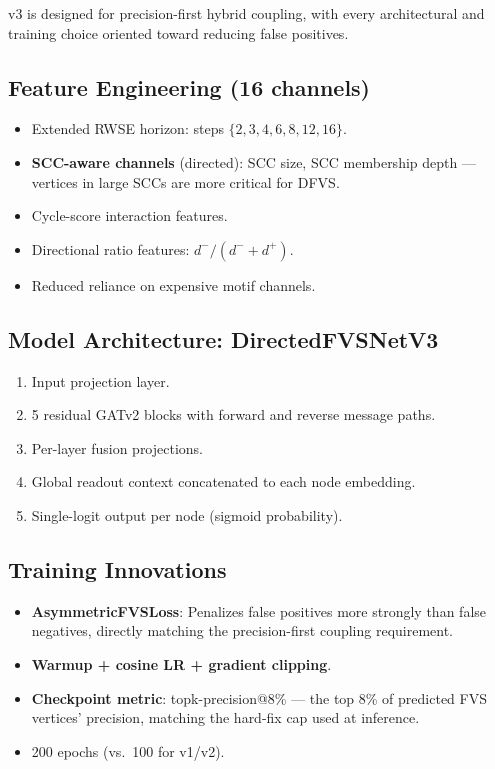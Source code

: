 \documentclass[10pt,a4paper]{report}
\theoremstyle{definition}
\begin{document}
v3 is designed for precision-first hybrid coupling, with every architectural and training choice oriented toward reducing false positives.

\subsection{Feature Engineering (16 channels)}

\begin{itemize}
	\item Extended RWSE horizon: steps $\{2, 3, 4, 6, 8, 12, 16\}$.
	\item \textbf{SCC-aware channels} (directed): SCC size, SCC membership depth — vertices in large SCCs are more critical for DFVS.
	\item Cycle-score interaction features.
	\item Directional ratio features: $d^-/(d^-+d^+)$.
	\item Reduced reliance on expensive motif channels.
\end{itemize}

\subsection{Model Architecture: DirectedFVSNetV3}

\begin{enumerate}
	\item Input projection layer.
	\item 5 residual GATv2 blocks \cite{brody2022} with forward and reverse message paths.
	\item Per-layer fusion projections.
	\item Global readout context concatenated to each node embedding.
	\item Single-logit output per node (sigmoid probability).
\end{enumerate}

\subsection{Training Innovations}

\begin{itemize}
	\item \textbf{AsymmetricFVSLoss}: Penalizes false positives more strongly than false negatives, directly matching the precision-first coupling requirement.
	\item \textbf{Warmup + cosine LR + gradient clipping}.
	\item \textbf{Checkpoint metric}: topk-precision@8\% --- the top 8\% of predicted FVS vertices' precision, matching the hard-fix cap used at inference.
	\item 200 epochs (vs.\ 100 for v1/v2).
\end{itemize}
\end{document}
